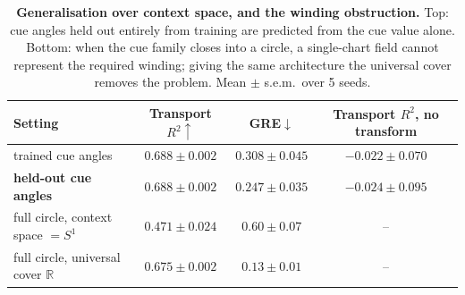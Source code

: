 \begin{table}[t]
\centering
\caption{\textbf{Generalisation over context space, and the winding obstruction.} Top: cue angles held out entirely from training are predicted from the cue value alone. Bottom: when the cue family closes into a circle, a single-chart field cannot represent the required winding; giving the same architecture the universal cover removes the problem. Mean $\pm$ s.e.m.\ over 5 seeds.}
\label{tab:continuous}
\vspace{2pt}
\small
\begin{tabular}{lccc}
\toprule
Setting & Transport $R^2\!\uparrow$ & GRE$\downarrow$ & Transport $R^2$, no transform \\
\midrule
trained cue angles & $0.688 \pm 0.002$ & $0.308 \pm 0.045$ & $-0.022 \pm 0.070$ \\
\textbf{held-out cue angles} & $0.688 \pm 0.002$ & $0.247 \pm 0.035$ & $-0.024 \pm 0.095$ \\
\midrule
full circle, context space $= S^1$ & $0.471 \pm 0.024$ & $0.60 \pm 0.07$ & -- \\
full circle, universal cover $\mathbb{R}$ & $0.675 \pm 0.002$ & $0.13 \pm 0.01$ & -- \\
\bottomrule
\end{tabular}
\end{table}
